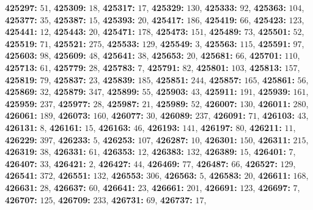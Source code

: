 \textsf{\bfseries 425297:} $51$, \textsf{\bfseries 425309:} $18$, \textsf{\bfseries 425317:} $17$, \textsf{\bfseries 425329:} $130$, \textsf{\bfseries 425333:} $92$, \textsf{\bfseries 425363:} $104$, \textsf{\bfseries 425377:} $35$, \textsf{\bfseries 425387:} $15$, \textsf{\bfseries 425393:} $20$, \textsf{\bfseries 425417:} $186$, \textsf{\bfseries 425419:} $66$, \textsf{\bfseries 425423:} $123$, \textsf{\bfseries 425441:} $12$, \textsf{\bfseries 425443:} $20$, \textsf{\bfseries 425471:} $178$, \textsf{\bfseries 425473:} $151$, \textsf{\bfseries 425489:} $73$, \textsf{\bfseries 425501:} $52$, \textsf{\bfseries 425519:} $71$, \textsf{\bfseries 425521:} $275$, \textsf{\bfseries 425533:} $129$, \textsf{\bfseries 425549:} $3$, \textsf{\bfseries 425563:} $115$, \textsf{\bfseries 425591:} $97$, \textsf{\bfseries 425603:} $98$, \textsf{\bfseries 425609:} $48$, \textsf{\bfseries 425641:} $38$, \textsf{\bfseries 425653:} $20$, \textsf{\bfseries 425681:} $66$, \textsf{\bfseries 425701:} $110$, \textsf{\bfseries 425713:} $61$, \textsf{\bfseries 425779:} $28$, \textsf{\bfseries 425783:} $7$, \textsf{\bfseries 425791:} $82$, \textsf{\bfseries 425801:} $103$, \textsf{\bfseries 425813:} $157$, \textsf{\bfseries 425819:} $79$, \textsf{\bfseries 425837:} $23$, \textsf{\bfseries 425839:} $185$, \textsf{\bfseries 425851:} $244$, \textsf{\bfseries 425857:} $165$, \textsf{\bfseries 425861:} $56$, \textsf{\bfseries 425869:} $32$, \textsf{\bfseries 425879:} $347$, \textsf{\bfseries 425899:} $55$, \textsf{\bfseries 425903:} $43$, \textsf{\bfseries 425911:} $191$, \textsf{\bfseries 425939:} $161$, \textsf{\bfseries 425959:} $237$, \textsf{\bfseries 425977:} $28$, \textsf{\bfseries 425987:} $21$, \textsf{\bfseries 425989:} $52$, \textsf{\bfseries 426007:} $130$, \textsf{\bfseries 426011:} $280$, \textsf{\bfseries 426061:} $189$, \textsf{\bfseries 426073:} $160$, \textsf{\bfseries 426077:} $30$, \textsf{\bfseries 426089:} $237$, \textsf{\bfseries 426091:} $71$, \textsf{\bfseries 426103:} $43$, \textsf{\bfseries 426131:} $8$, \textsf{\bfseries 426161:} $15$, \textsf{\bfseries 426163:} $46$, \textsf{\bfseries 426193:} $141$, \textsf{\bfseries 426197:} $80$, \textsf{\bfseries 426211:} $11$, \textsf{\bfseries 426229:} $397$, \textsf{\bfseries 426233:} $5$, \textsf{\bfseries 426253:} $107$, \textsf{\bfseries 426287:} $10$, \textsf{\bfseries 426301:} $150$, \textsf{\bfseries 426311:} $215$, \textsf{\bfseries 426319:} $38$, \textsf{\bfseries 426331:} $61$, \textsf{\bfseries 426353:} $12$, \textsf{\bfseries 426383:} $132$, \textsf{\bfseries 426389:} $15$, \textsf{\bfseries 426401:} $7$, \textsf{\bfseries 426407:} $33$, \textsf{\bfseries 426421:} $2$, \textsf{\bfseries 426427:} $44$, \textsf{\bfseries 426469:} $77$, \textsf{\bfseries 426487:} $66$, \textsf{\bfseries 426527:} $129$, \textsf{\bfseries 426541:} $372$, \textsf{\bfseries 426551:} $132$, \textsf{\bfseries 426553:} $306$, \textsf{\bfseries 426563:} $5$, \textsf{\bfseries 426583:} $20$, \textsf{\bfseries 426611:} $168$, \textsf{\bfseries 426631:} $28$, \textsf{\bfseries 426637:} $60$, \textsf{\bfseries 426641:} $23$, \textsf{\bfseries 426661:} $201$, \textsf{\bfseries 426691:} $123$, \textsf{\bfseries 426697:} $7$, \textsf{\bfseries 426707:} $125$, \textsf{\bfseries 426709:} $233$, \textsf{\bfseries 426731:} $69$, \textsf{\bfseries 426737:} $17$, 
